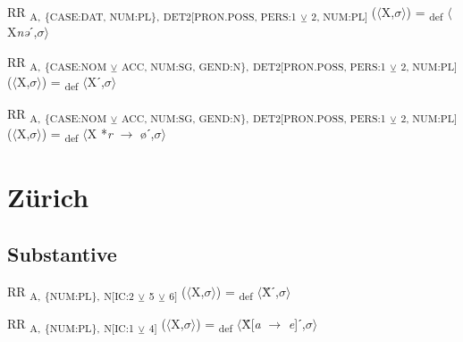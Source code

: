 {\begin{exe}
 RR \textsubscript{A,} \textsubscript{\{CASE:DAT, NUM:PL\},} \textsubscript{DET2[PRON.POSS, PERS:1} \textsubscript{${\veebar}$}\textsubscript{ 2, NUM:PL]} ($\langle$X,$\sigma $$\rangle$) = \textsubscript{def} $\langle$X\textit{nə}ˊ,$\sigma $$\rangle$
\end{exe}

\begin{exe}
 RR \textsubscript{A,} \textsubscript{\{CASE:NOM} \textsubscript{${\veebar}$}\textsubscript{ ACC, NUM:SG, GEND:N\},} \textsubscript{DET2[PRON.POSS, PERS:1} \textsubscript{${\veebar}$}\textsubscript{ 2, NUM:PL]} ($\langle$X,$\sigma $$\rangle$) = \textsubscript{def} $\langle$Xˊ,$\sigma $$\rangle$
\end{exe}

\begin{exe}
 RR \textsubscript{A,} \textsubscript{\{CASE:NOM} \textsubscript{${\veebar}$}\textsubscript{ ACC, NUM:SG, GEND:N\},} \textsubscript{DET2[PRON.POSS, PERS:1} \textsubscript{${\veebar}$}\textsubscript{ 2, NUM:PL]} ($\langle$X,$\sigma $$\rangle$) = \textsubscript{def} $\langle$X *\textit{r} $\rightarrow$ øˊ,$\sigma $$\rangle$
\end{exe}

\section{Zürich}

\subsection{Substantive}

\begin{exe}
 RR \textsubscript{A,} \textsubscript{\{NUM:PL\},} \textsubscript{N[IC:2} \textsubscript{${\veebar}$}\textsubscript{ 5} \textsubscript{${\veebar}$}\textsubscript{ 6]} ($\langle$X,$\sigma $$\rangle$) = \textsubscript{def} $\langle$Ẍˊ,$\sigma $$\rangle$
\end{exe}

\begin{exe}
 RR \textsubscript{A,} \textsubscript{\{NUM:PL\},} \textsubscript{N[IC:1} \textsubscript{${\veebar}$}\textsubscript{ 4]} ($\langle$X,$\sigma $$\rangle$) = \textsubscript{def} $\langle$Ẍ[\textit{a} $\rightarrow$ \textit{e}]ˊ,$\sigma $$\rangle$
\end{exe}

}
